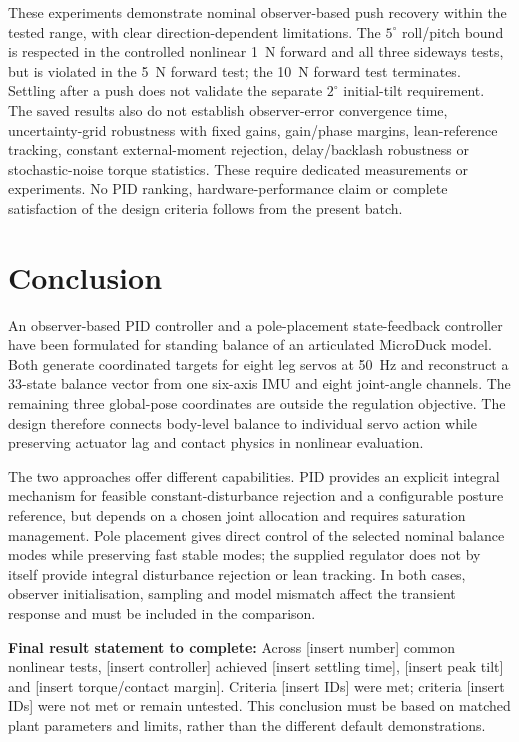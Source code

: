 \documentclass[conference,a4paper]{IEEEtran}
\begin{document}
These experiments demonstrate nominal observer-based push recovery within the tested range, with clear direction-dependent limitations. The $5^\circ$ roll/pitch bound is respected in the controlled nonlinear 1~N forward and all three sideways tests, but is violated in the 5~N forward test; the 10~N forward test terminates. Settling after a push does not validate the separate $2^\circ$ initial-tilt requirement. The saved results also do not establish observer-error convergence time, uncertainty-grid robustness with fixed gains, gain/phase margins, lean-reference tracking, constant external-moment rejection, delay/backlash robustness or stochastic-noise torque statistics. These require dedicated measurements or experiments. No PID ranking, hardware-performance claim or complete satisfaction of the design criteria follows from the present batch.

\section{Conclusion}
An observer-based PID controller and a pole-placement state-feedback
controller have been formulated for standing balance of an articulated
MicroDuck model. Both generate coordinated targets for eight leg servos at
50~Hz and reconstruct a 33-state balance vector from one six-axis IMU and
eight joint-angle channels. The remaining three global-pose coordinates are
outside the regulation objective. The design therefore connects body-level
balance to individual servo action while preserving actuator lag and contact
physics in nonlinear evaluation.

The two approaches offer different capabilities. PID provides an explicit
integral mechanism for feasible constant-disturbance rejection and a
configurable posture reference, but depends on a chosen joint allocation and
requires saturation management. Pole placement gives direct control of the
selected nominal balance modes while preserving fast stable modes; the
supplied regulator does not by itself provide integral disturbance rejection
or lean tracking. In both cases, observer initialisation, sampling and model
mismatch affect the transient response and must be included in the comparison.

\textbf{Final result statement to complete:} Across [insert number] common
nonlinear tests, [insert controller] achieved [insert settling time], [insert
peak tilt] and [insert torque/contact margin]. Criteria [insert IDs] were met;
criteria [insert IDs] were not met or remain untested. This conclusion must
be based on matched plant parameters and limits, rather than the different
default demonstrations.
\end{document}

